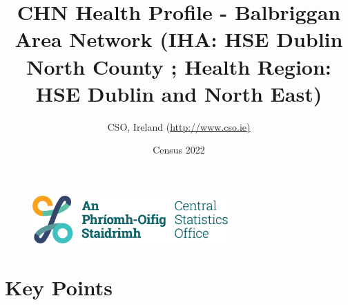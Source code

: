 \documentclass{article}
\title{CHN Health Profile - Balbriggan Area Network (IHA: HSE Dublin North County ;  Health Region: HSE Dublin and North East) }
\date{Census 2022}
\author{CSO, Ireland  (\url{http://www.cso.ie)}}
\begin{document}


\begin{figure}
	\centering
\includegraphics[width =75mm]{../figures/CSO_Logo.png}
\end{figure}

				 
		   
						  
														  
																																													
												 
			 
\maketitle
					
													   
				 
						 
																																																																											   
				 
				  
  \pagebreak
    	    \tableofcontents

\pagebreak


\section{Key Points}
\end{document}
